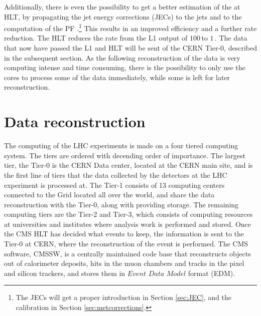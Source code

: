Additionally, there is even the possibility to get a better estimation of the \ptmiss at HLT, by propagating the jet energy corrections (JECs) to the jets and to the computation of the PF \ptmiss.\footnote{The JECs will get a proper introduction in Section \ref{sec:JEC}, and the \ptmiss calibration in Section \ref{sec:metcorrections}.} 
This results in an improved efficiency and a further rate reduction. 
The HLT reduces the rate from the L1 output of $100\,$\kHz to $1\,$\kHz. 
The data that now have passed the L1 and HLT will be sent of the CERN Tier-0, described in the subsequent section. 
As the following reconstruction of the data is very computing intense and time consuming, there is the possibility to only use the cores to process some of the data immediately, while some is left for later reconstruction. 
\section{Data reconstruction}
\noindent\justify
The computing of the LHC experiments is made on a four tiered computing system. The tiers are ordered with decending order of importance. 
The largest tier, the Tier-0 is the CERN Data center, located at the CERN main site, and is the first line of tiers that the data collected by the detectors at the LHC experiment is processed at. 
The Tier-1 consists of 13 computing centers connected to the Grid located all over the world, and share the data reconstruction with the Tier-0, along with providing storage.
The remaining computing tiers are the Tier-2 and Tier-3, which consists of computing resources at universities and institutes where analysis work is performed and stored. 
Once the CMS HLT has decided what events to keep, the information is sent to the Tier-0 at CERN, where the reconstruction of the event is performed. 
The CMS software, CMSSW, is a centrally maintained code base that reconstructs objects out of calorimeter deposits, hits in the muon chambers and tracks in the pixel and silicon trackers, and stores them in $Event$ $Data$ $Model$ format (EDM).    
